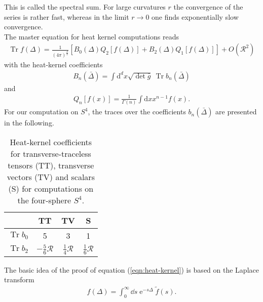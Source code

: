 This is called the spectral sum. For large curvatures $r$ the convergence of the series is rather fast, whereas in the limit $r\rightarrow 0$ one finds exponentially slow convergence.\\
The master equation for heat kernel computations reads
\begin{align}
	\operatorname{Tr} f(\Delta)=\frac{1}{(4 \pi)^{\frac{d}{2}}}\left[B_{0}(\Delta) Q_{2}[f(\Delta)]+B_{2}(\Delta) Q_{1}[f(\Delta)]\right]+O\left(\mathcal{R}^{2}\right)
\end{align}
with the heat-kernel coefficients 
\begin{align}
	B_{n}(\bar{\Delta})=\int \mathrm{d}^{d} x \sqrt{\operatorname{det}\bar{g}} \  \operatorname{Tr} b_{n}(\bar{\Delta})
\end{align}
and 
\begin{align}
	Q_{n}[f(x)]=\frac{1}{\Gamma(n)} \int \mathrm{d} x x^{n-1} f(x).
\end{align}
For our computation on $S^4$, the traces over the coefficients $b_n(\bar{\Delta})$ are presented in the following.
\begin{table}[H]
	\centering
	\setlength{\tabcolsep}{5mm}
	\setlength\extrarowheight{2mm}
	\begin{tabular}{c | c c c}
	   & TT & TV & S\\ \hline
	   $\operatorname{Tr} b_{0}$ & 5 &  3 & 1\\
	  $\operatorname{Tr} b_{2}$ & $-\frac{5}{6}\mathcal{R}$ & $\frac{1}{4}\mathcal{R}$& $\frac{1}{6}\mathcal{R}$\\
	\end{tabular}
	\caption{Heat-kernel coefficients for transverse-traceless tensors (TT), transverse vectors (TV) and scalars (S) for computations on the four-sphere $S^4$.}
\end{table}

The basic idea of the proof of equation (\ref{eqn:heat-kernel}) is based on the Laplace transform
\begin{align}
	f(\Delta) = \int_0^{\infty} \dd s \operatorname{e}^{-s\Delta}\tilde{f}(s).
\end{align}


